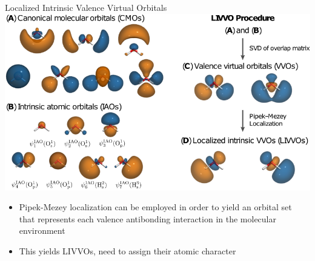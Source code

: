 \documentclass[t]{beamer}
\begin{document}
\begin{frame}{Localized Intrinsic Valence Virtual Orbitals}
\centering
\includegraphics[width=0.75\linewidth]{livvo_procedure_4.png}
\begin{itemize}
\item Pipek-Mezey localization can be employed in order to yield an orbital set that represents each valence antibonding interaction in the molecular environment
\item This yields LIVVOs, need to assign their atomic character
\end{itemize}
\end{frame}
\end{document}
